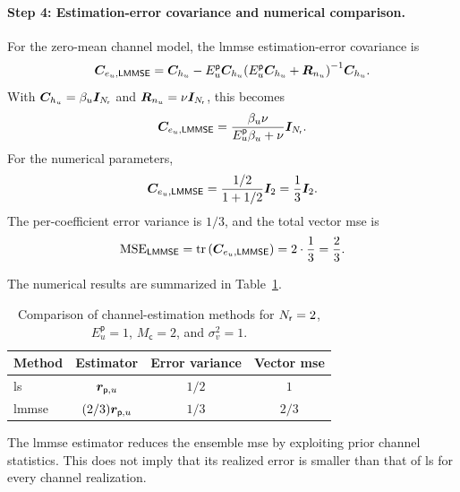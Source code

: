 \paragraph{Step 4: Estimation-error covariance and numerical comparison.}
For the zero-mean channel model, the \ac{lmmse} estimation-error covariance is
\begin{equation}
	\bm{C}_{e_u,\mathsf{LMMSE}}
	=\bm{C}_{h_u}
	-E_u^{\mathsf p}\bm{C}_{h_u}
	{(E_u^{\mathsf p}\bm{C}_{h_u}+\bm{R}_{n_u})}^{-1}
	\bm{C}_{h_u}.
	\label{eq06:pilot-lmmse-error}
\end{equation}
With $\bm{C}_{h_u}=\beta_u\bm{I}_{N_{\mathsf{r}}}$ and $\bm{R}_{n_u}=\nu\bm{I}_{N_{\mathsf{r}}}$, this becomes
\begin{equation*}
	\bm{C}_{e_u,\mathsf{LMMSE}}
	=\frac{\beta_u\nu}{E_u^{\mathsf p}\beta_u+\nu}\bm{I}_{N_{\mathsf{r}}}.
\end{equation*}
For the numerical parameters,
\begin{equation*}
	\bm{C}_{e_u,\mathsf{LMMSE}}
	=\frac{1/2}{1+1/2}\bm{I}_2
	=\frac13\bm{I}_2.
\end{equation*}
The per-coefficient error variance is $1/3$, and the total vector \ac{mse} is
\begin{equation*}
	\mathrm{MSE}_{\mathsf{LMMSE}}
	=\operatorname{tr}\left(\bm{C}_{e_u,\mathsf{LMMSE}}\right)
	=2\cdot\frac13=\frac23.
\end{equation*}

The numerical results are summarized in Table~\ref{tab06:estimation-comparison}.
\begin{table}[htbp]
	\centering
	\caption{Comparison of channel-estimation methods for $N_{\mathsf{r}}=2$, $E_u^{\mathsf p}=1$, $M_{\mathsf c}=2$, and $\sigma_v^2=1$.}
	\label{tab06:estimation-comparison}
	\begin{tabular}{lccc}
		\toprule
		Method & Estimator & Error variance & Vector \ac{mse}\\
		\midrule
		\ac{ls} & $\bm{r}_{\mathsf p,u}$ & $1/2$ & $1$\\
		\ac{lmmse} & $(2/3)\bm{r}_{\mathsf p,u}$ & $1/3$ & $2/3$\\
		\bottomrule
	\end{tabular}
\end{table}
The \ac{lmmse} estimator reduces the ensemble \ac{mse} by exploiting prior channel statistics. This does not imply that its realized error is smaller than that of \ac{ls} for every channel realization.

